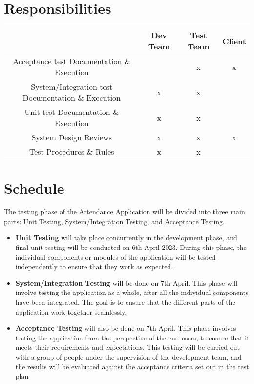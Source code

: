 \documentclass{scrreprt}
\begin{document}
\chapter{Responsibilities}
\begin{center}
\begin{tabular}{|c | c | c | c|} 
 \hline
   & Dev Team & Test Team & Client \\ [0.5ex] 
 \hline
 Acceptance test Documentation \& Execution  &  & x & x \\ 
 \hline
 System/Integration test Documentation \& Execution & x & x &  \\
 \hline
 Unit test Documentation \& Execution & x & x &  \\
 \hline
 System Design Reviews & x & x & x \\
 \hline
 Test Procedures \& Rules & x & x &  \\ [1ex] 
 \hline
\end{tabular}
\end{center}

\chapter{Schedule}
The testing phase of the Attendance Application will be divided into three main parts: Unit Testing, System/Integration Testing, and Acceptance Testing. \\

\begin{itemize}
    \item \textbf{Unit Testing} will take place concurrently in the development phase, and final unit testing will be conducted on 6th April 2023. During this phase, the individual components or modules of the application will be tested independently to ensure that they work as expected.
    \item  \textbf{System/Integration Testing}  will be done on 7th April. This phase will involve testing the application as a whole, after all the individual components have been integrated. The goal is to ensure that the different parts of the application work together seamlessly.
    \item \textbf{Acceptance Testing} will also be done on 7th April. This phase involves testing the application from the perspective of the end-users, to ensure that it meets their requirements and expectations. This testing will be carried out with a group of people under the supervision of the development team, and the results will be evaluated against the acceptance criteria set out in the test plan
\end{itemize}
\end{document}
